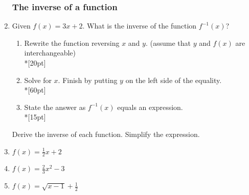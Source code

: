 \documentclass[12pt, twoside]{article}
\begin{document}
\begin{enumerate}
\newpage
\subsubsection*{The inverse of a function}

  \item Given $f(x)=3x+2$. What is the inverse of the function $f^{-1} (x)$?

  \begin{enumerate}
      \item Rewrite the function reversing $x$ and $y$. (assume that $y$ and $f(x)$ are interchangeable)\\*[20pt]
      \item Solve for $x$. Finish by putting $y$ on the left side of the equality.\\*[60pt]
      \item State the answer as $f^{-1} (x)$ equals an expression.\\*[15pt]
  \end{enumerate}

  Derive the inverse of each function. Simplify the expression.
  \item   $f(x)=\frac{1}{2}x+2$
  \item   $f(x)=\frac{2}{3}x^2-3$
  \item   $f(x)=\sqrt{x-1}+\frac{1}{2}$

  \end{enumerate}
\end{document}
